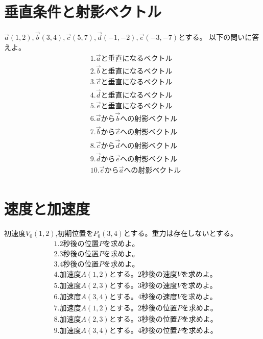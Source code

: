 \documentclass[paper=b4j,landscape,twocolumn,fleqn]{jlreq}
\begin{document}
\section{垂直条件と射影ベクトル}  
$\vec{a}(1,2),　\vec{b}(3,4),　\vec{c}(5,7),　\vec{d}(-1,-2),　\vec{e}(-3,-7)$とする。
以下の問いに答えよ。\\
\begin{align*}
&1.　\vec{a} と垂直になるベクトル\\
&2.　\vec{b} と垂直になるベクトル\\
&3.　\vec{c} と垂直になるベクトル\\
&4.　\vec{d} と垂直になるベクトル\\
&5.　\vec{e} と垂直になるベクトル\\
&6.　\vec{a} から\vec{b}への射影ベクトル\\
&7.　\vec{b} から\vec{c}への射影ベクトル\\
&8.　\vec{c} から\vec{d}への射影ベクトル\\
&9.　\vec{d} から\vec{e}への射影ベクトル\\
&10.　\vec{e} から\vec{a}への射影ベクトル\\
\end{align*}

\newpage
\section{速度と加速度}
初速度$V_0(1,2)$,初期位置を$P_0(3,4)$とする。重力は存在しないとする。
\begin{align*}
&1.　2秒後の位置Pを求めよ。\\
&2.　3秒後の位置Pを求めよ。\\
&3.　4秒後の位置Pを求めよ。\\
&4.　加速度A(1,2)とする。2秒後の速度Vを求めよ。\\
&5.　加速度A(2,3)とする。3秒後の速度Vを求めよ。\\
&6.　加速度A(3,4)とする。4秒後の速度Vを求めよ。\\
&7.　加速度A(1,2)とする。2秒後の位置Pを求めよ。\\
&8.　加速度A(2,3)とする。3秒後の位置Pを求めよ。\\
&9.　加速度A(3,4)とする。4秒後の位置Pを求めよ。\\
\end{align*}
\end{document}
